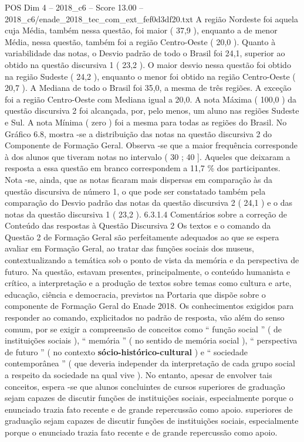 \begin{textsample}{POS Dim 4 – 2018\_c6 – Score 13.00 – 2018\_c6/enade\_2018\_tec\_com\_ext\_fef0d3df20.txt}
A região Nordeste foi aquela cuja Média, também nessa questão, foi maior ( 37,9 ), enquanto a de menor Média, nessa questão, também foi a região Centro-Oeste ( 20,0 ).
Quanto à variabilidade das notas, o Desvio padrão de todo o Brasil foi 24,1, superior ao obtido na questão discursiva 1 ( 23,2 ).
O maior desvio nessa questão foi obtido na região Sudeste ( 24,2 ), enquanto o menor foi obtido na região Centro-Oeste ( 20,7 ).
A Mediana de todo o Brasil foi 35,0, a mesma de três regiões.
A exceção foi a região Centro-Oeste com Mediana igual a 20,0.
A nota Máxima ( 100,0 ) da questão discursiva 2 foi alcançada, por, pelo menos, um aluno nas regiões Sudeste e Sul.
A nota Mínima ( zero ) foi a mesma para todas as regiões do Brasil.
No Gráfico 6.8, mostra -se a distribuição das notas na questão discursiva 2 do Componente de Formação Geral.
Observa -se que a maior frequência corresponde à dos alunos que tiveram notas no intervalo ( 30 ; 40 ].
Aqueles que deixaram a resposta a essa questão em branco correspondem a 11,7 \% dos participantes.
Nota -se, ainda, que as notas ficaram mais dispersas em comparação às da questão discursiva de número 1, o que pode ser constatado também pela comparação do Desvio padrão das notas da questão discursiva 2 ( 24,1 ) e o das notas da questão discursiva 1 ( 23,2 ). 6.3.1.4 Comentários sobre a correção de Conteúdo das respostas à Questão Discursiva 2 Os textos e o comando da Questão 2 de Formação Geral são perfeitamente adequados ao que se espera avaliar em Formação Geral, ao tratar das funções sociais dos museus, contextualizando a temática sob o ponto de vista da memória e da perspectiva de futuro.
Na questão, estavam presentes, principalmente, o conteúdo humanista e crítico, a interpretação e a produção de textos sobre temas como cultura e arte, educação, ciência e democracia, previstos na Portaria que dispõe sobre o componente de Formação Geral do Enade 2018.
Os conhecimentos exigidos para responder ao comando, explicitados no padrão de resposta, vão além do senso comum, por se exigir a compreensão de conceitos como “ função social ” ( de instituições sociais ), “ memória ” ( no sentido de memória social ), “ perspectiva de futuro ” ( no contexto \textbf{sócio-histórico-cultural} ) e “ sociedade contemporânea ” ( que deveria independer da interpretação de cada grupo social a respeito da sociedade na qual vive ).
No entanto, apesar de envolver tais conceitos, espera -se que alunos concluintes de cursos superiores de graduação sejam capazes de discutir funções de instituições sociais, especialmente porque o enunciado trazia fato recente e de grande repercussão como apoio. superiores de graduação sejam capazes de discutir funções de instituições sociais, especialmente porque o enunciado trazia fato recente e de grande repercussão como apoio.

\end{textsample}
